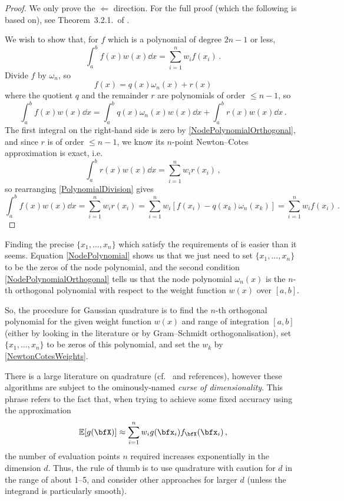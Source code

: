 \begin{proof}
We only prove the $\Leftarrow$ direction. For the full proof (which the following is based on), see Theorem~3.2.1.\ of \cite{gautschi2011numerical}.

We wish to show that, for $f$ which is a polynomial of degree $2n-1$ or less,
\[ \int_a^b f(x) w(x) \dd x = \sum_{i=1}^n w_i f(x_i) \,. \]
Divide $f$ by $\omega_n$, so
\begin{equation} \label{PolynomialDivision}
	f(x) = q(x) \omega_n(x) + r(x)
\end{equation}
where the quotient $q$ and the remainder $r$ are polynomials of order $\le n-1$, so
\[ \int_a^b f(x) w(x) \dd x = \int_a^b q(x) \omega_n(x) w(x) \dd x + \int_a^b r(x) w(x) \dd x \,. \]
The first integral on the right-hand side is zero by \eqref{NodePolynomialOrthogonal},
and since $r$ is of order $\le n-1$, we know its $n$-point Newton--Cotes approximation is exact, i.e.
\[ \int_a^b r(x) w(x) \dd x = \sum_{i=1}^n w_i r(x_i) \,, \]
so rearranging \eqref{PolynomialDivision} gives
\[ \int_a^b f(x) w(x) \dd x = \sum_{i=1}^n w_i r(x_i) = \sum_{i=1}^n w_i [f(x_i) - q(x_k) \omega_n(x_k)] = \sum_{i=1}^n w_i f(x_i) \,. \]
\end{proof}

Finding the precise $\{x_1, \dots, x_n\}$ which satisfy the requirements of  is easier than it seems. Equation \eqref{NodePolynomial} shows us that we just need to set $\{x_1, \dots, x_n\}$ to be the zeros of the node polynomial, and the second condition \eqref{NodePolynomialOrthogonal} tells us that the node polynomial $\omega_n(x)$ is the $n$-th orthogonal polynomial with respect to the weight function $w(x)$ over $[a,b]$.

So, the procedure for Gaussian quadrature is to find the $n$-th orthogonal polynomial for the given weight function $w(x)$ and range of integration $[a,b]$ (either by looking in the literature or by Gram--Schmidt orthogonalisation), set $\{x_1, \dots, x_n\}$ to be zeros of this polynomial, and set the $w_k$ by \eqref{NewtonCotesWeights}.

There is a large literature on quadrature (cf.\ \cite{gautschi2011numerical} and references), however these algorithms are subject to the ominously-named \emph{curse of dimensionality}. This phrase refers to the fact that, when trying to achieve some fixed accuracy using the approximation
\begin{equation*} \label{basic_num_int}
\Exp[g(\bfX)] \approx \sum_{i=1}^n w_i g( \bfx_i ) f_{\bfX}( \bfx_i ) \,,
\end{equation*}
the number of evaluation points $n$ required increases exponentially in the dimension $d$. Thus, the rule of thumb is to use quadrature with caution for $d$ in the range of about 1--5, and consider other approaches for larger $d$ (unless the integrand is particularly smooth).


